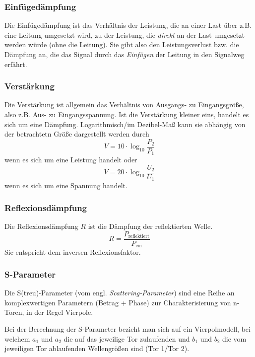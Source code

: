 \subsubsection{Einfügedämpfung}
Die Einfügedämpfung ist das Verhältnis der Leistung, die an einer Last über z.B.
eine Leitung umgesetzt wird, zu der Leistung, die
\emph{direkt} an der Last umgesetzt werden würde (ohne die Leitung). Sie gibt
also den Leistungsverlust bzw. die Dämpfung an, die das Signal durch das \textit{Einfügen} der Leitung in den
Signalweg erfährt.

\subsubsection{Verstärkung}
Die Verstärkung ist allgemein das Verhältnis von Ausgangs- zu Eingangsgröße,
also z.B. Aus- zu Eingangsspannung. Ist die Verstärkung kleiner eins, handelt es
sich um eine Dämpfung. Logarithmisch/im Dezibel-Maß kann sie abhängig von der
betrachtetn Größe dargestellt werden durch
\[V = 10 \cdot \log_{10}{\frac{P_2}{P_1}}\]
wenn es sich um eine Leistung handelt oder
\[V = 20 \cdot \log_{10}{\frac{U_2}{U_1}}\]
wenn es sich um eine Spannung handelt.

\subsubsection{Reflexionsdämpfung}
Die Reflexionsdämpfung $R$ ist die Dämpfung der reflektierten Welle.
\[R = \frac{P_\mathrm{reflektiert}}{P_\mathrm{ein}}\]
Sie entspricht dem inversen Reflexionsfaktor.


\subsubsection{S-Parameter}
Die S(treu)-Parameter (vom engl. \emph{Scattering-Parameter}) sind eine Reihe an
komplexwertigen Parametern (Betrag + Phase) zur Charakterisierung von n-Toren,
in der Regel Vierpole.

Bei der Berechnung der S-Parameter bezieht man sich auf ein Vierpolmodell, bei
welchem $a_1$ und $a_2$ die auf das jeweilige Tor zulaufenden und $b_1$ und
$b_2$ die vom jeweiligen Tor ablaufenden Wellengrößen sind (Tor 1/Tor 2).

